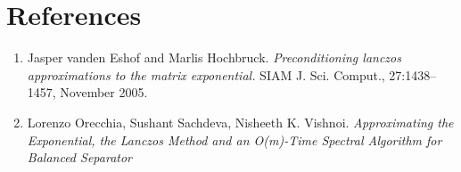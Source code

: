 \documentclass[a4paper, fleqn]{article}
\begin{document}
\section*{References}%
\label{sec:references}
\begin{enumerate}
        \item Jasper vanden Eshof and Marlis Hochbruck. \textit{Preconditioning lanczos approximations to the matrix exponential.} SIAM J. Sci. Comput., 27:1438–1457, November 2005.
        \item Lorenzo Orecchia, Sushant Sachdeva, Nisheeth K. Vishnoi. \textit{Approximating the Exponential, the Lanczos Method and an O(m)-Time Spectral Algorithm for Balanced Separator}
\end{enumerate}
\end{document}
